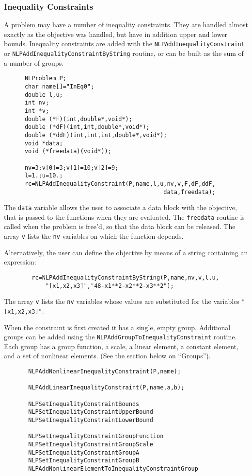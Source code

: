 \documentclass[12pt]{article}
\begin{document}
   \subsubsection{Inequality Constraints}

     A problem may have a number of inequality constraints. They are handled almost exactly as the objective was handled,
     but have in addition upper and lower bounds. Inequality constraints are added with the {\tt NLPAdd\-Inequality\-Constraint}
     or {\tt NLPAdd\-Inequality\-Constraint\-ByString} routine, or can be built as the sum of a number of groups.
     \begin{verbatim}
      NLProblem P;
      char name[]="InEq0";
      double l,u;
      int nv;
      int *v;
      double (*F)(int,double*,void*);
      double (*dF)(int,int,double*,void*);
      double (*ddF)(int,int,int,double*,void*);
      void *data;
      void (*freedata)(void*));

      nv=3;v[0]=3;v[1]=10;v[2]=9;
      l=1.;u=10.;
      rc=NLPAddInequalityConstraint(P,name,l,u,nv,v,F,dF,ddF,
                                              data,freedata);
     \end{verbatim}
     The {\tt data} variable allows the user to associate a data block with the objective, that is passed to the
     functions when they are evaluated. The {\tt freedata} routine is called when the problem is free'd, so that
     the data block can be released. The array {\tt v} lists the {\tt nv} variables on which the function depends.

     Alternatively, the user can define the objective by means of a string containing an expression:
     \begin{verbatim}
        rc=NLPAddInequalityConstraintByString(P,name,nv,v,l,u,
            "[x1,x2,x3]","48-x1**2-x2**2-x3**2");
     \end{verbatim}
     The array {\tt v} lists the {\tt nv} variables whose values are substituted for the variables
     {\tt "[x1,x2,x3]"}.

     When the constraint is first created it has a single, empty group. Additional groups can be added using the
     {\tt NLPAdd\-Group\-To\-Inequality\-Constraint} routine. Each group has a group function, a scale, a linear element,
     a constant element, and a set of nonlinear elements. (See the section below on ``Groups'').
     \begin{verbatim}
       NLPAddNonlinearInequalityConstraint(P,name);

       NLPAddLinearInequalityConstraint(P,name,a,b);

       NLPSetInequalityConstraintBounds
       NLPSetInequalityConstraintUpperBound
       NLPSetInequalityConstraintLowerBound

       NLPSetInequalityConstraintGroupFunction
       NLPSetInequalityConstraintGroupScale
       NLPSetInequalityConstraintGroupA
       NLPSetInequalityConstraintGroupB
       NLPAddNonlinearElementToInequalityConstraintGroup
     \end{verbatim}
\end{document}
